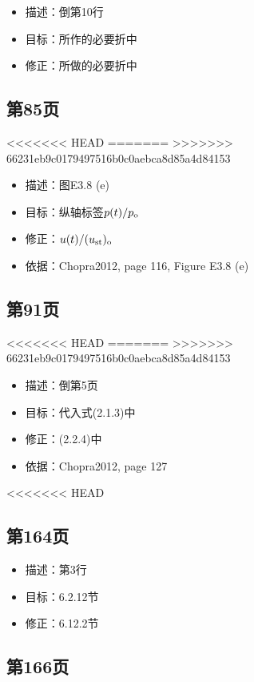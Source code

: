 \documentclass[11pt]{article}
\begin{document}
\begin{itemize}
\item 描述：倒第10行
\item 目标：所作的必要折中
\item 修正：所做的必要折中
\end{itemize}

\subsection*{第85页}
<<<<<<< HEAD
\label{sec:org1bd92a7}
=======
\label{sec:org4f05035}
>>>>>>> 66231eb9c0179497516b0c0aebca8d85a4d84153

\begin{itemize}
\item 描述：图E3.8 (e)
\item 目标：纵轴标签\({p}(t) / {p}_{\mathrm{o}}\)
\item 修正：\(u(t) / (u_{\mathrm{st}})_{\mathrm{o}}\)
\item 依据：Chopra2012, page 116, Figure E3.8 (e)
\end{itemize}

\subsection*{第91页}
<<<<<<< HEAD
\label{sec:org4cae8da}
=======
\label{sec:org3b211a0}
>>>>>>> 66231eb9c0179497516b0c0aebca8d85a4d84153

\begin{itemize}
\item 描述：倒第5页
\item 目标：代入式(2.1.3)中
\item 修正：(2.2.4)中
\item 依据：Chopra2012, page 127
\end{itemize}

<<<<<<< HEAD
\subsection*{第164页}
\label{sec:org90347bc}

\begin{itemize}
\item 描述：第3行
\item 目标：6.2.12节
\item 修正：6.12.2节
\end{itemize}

\subsection*{第166页}
\label{sec:orge65ee9b}
\end{document}
